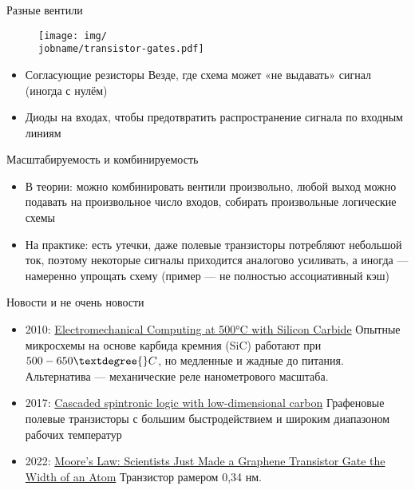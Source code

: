 \documentclass[xetex,aspectratio=43]{beamer}
\begin{document}
\begin{frame}{Разные вентили}
    \begin{figure}
    \texttt{[image: img/\\jobname/transistor-gates.pdf]}
    \end{figure}

    \begin{itemize}
    \tightlist
    \item
      Согласующие резисторы Везде, где схема может «не выдавать» сигнал
      (иногда с нулём)
    \item
      Диоды на входах, чтобы предотвратить распространение сигнала по
      входным линиям
    \end{itemize}
\end{frame}

\begin{frame}{Масштабируемость и комбинируемость}
	\begin{itemize}
		\item
		В теории: можно комбинировать вентили произвольно, любой выход можно подавать на произвольное число входов, собирать произвольные логические схемы
		\pause
		\item
		На практике: есть утечки, даже полевые транзисторы потребляют небольшой ток, поэтому некоторые сигналы приходится аналогово усиливать, а иногда --- намеренно упрощать схему (пример --- не полностью ассоциативный кэш)
	\end{itemize}
\end{frame}

\begin{frame}{Новости и не очень новости}
\begin{itemize}
\item
  2010: \href{https://www.science.org/doi/abs/10.1126/science.1192511}{Electromechanical Computing at 500°C with Silicon Carbide}
  Опытные микросхемы на основе карбида кремния (SiC)
  работают при $500-650 \textdegree{}C$, но медленные и жадные до питания.
  Альтернатива --- механические реле нанометрового масштаба.
\item
  2017: \href{https://www.nature.com/articles/ncomms15635}{Cascaded spintronic logic with low-dimensional carbon}
  Графеновые полевые транзисторы с большим быстродействием и широким диапазоном рабочих температур
\item
  2022: \href{https://singularityhub.com/2022/03/13/moores-law-scientists-just-made-a-graphene-transistor-gate-the-width-of-an-atom/}{Moore’s Law: Scientists Just Made a Graphene Transistor Gate the Width of an Atom}
  Транзистор рамером 0,34 нм.
\end{itemize}

\end{frame}
\end{document}
